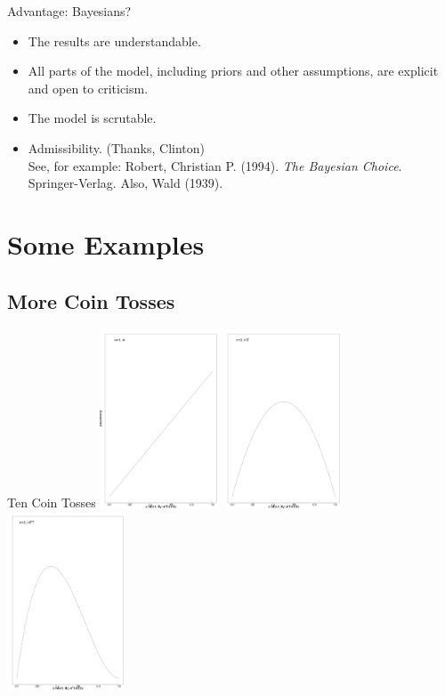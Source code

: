 \documentclass[dvipsnames,mathserif, handout]{beamer}
\begin{document}
{\begin{frame}{Advantage: Bayesians?}
    \begin{itemize}
    	\item The results are understandable. \pause
    	\item All parts of the model, including priors and other assumptions, are explicit and open to criticism. \pause
    	\item The model is scrutable. \pause
    	\item Admissibility. {\tiny (Thanks, Clinton)}\\
    	{\tiny See, for example: Robert, Christian P. (1994). \textit{The Bayesian Choice}. Springer-Verlag. Also, Wald (1939).}
    \end{itemize}
\end{frame}

\section{Some Examples}

\subsection{More Coin Tosses}

\begin{frame}{Ten Coin Tosses}
    	\includegraphics[width=100pt]{cointosses/One.pdf} 	\pause
    	\includegraphics[width=100pt]{cointosses/Two.pdf}  	\pause
    	\includegraphics[width=100pt]{cointosses/Three.pdf}	
\end{frame}

}
\end{document}
